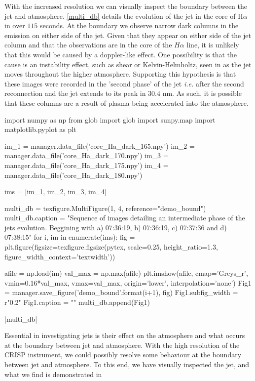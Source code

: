 \documentclass{emulateapj}
\begin{document}
With the increased resolution we can visually inspect the boundary between the jet and atmosphere.
\cref{multi_db} details the evolution of the jet in the core of H$\alpha$ in over $115$ seconds.
At the boundary we observe narrow dark columns in the emission on either side of the jet.
Given that they appear on either side of the jet column and that the observations are in the core of the $H\alpha$ line, it is unlikely that this would be caused by a doppler-like effect.
One possibility is that the cause is an instability effect, such as shear or Kelvin-Helmholtz, seen in \cite{Zaqarashvili2014} as the jet moves throughout the higher atmosphere.
Supporting this hypothesis is that these images were recorded in the 'second phase' of the jet \emph{i.e.} after the second reconnection and the jet extends to its peak in $30.4$ nm. 
As such, it is possible that these columns are a result of plasma being accelerated into the atmosphere.

\begin{pycode}
import numpy as np
from glob import glob
import sunpy.map
import matplotlib.pyplot as plt

im_1 = manager.data_file('core_Ha_dark_165.npy')
im_2 = manager.data_file('core_Ha_dark_170.npy')
im_3 = manager.data_file('core_Ha_dark_175.npy')
im_4 = manager.data_file('core_Ha_dark_180.npy')

ims = [im_1, im_2, im_3, im_4]

multi_db = texfigure.MultiFigure(1, 4, reference="demo_bound")
multi_db.caption = "Sequence of images detailing an intermediate phase of the jets evolution. Beggining with a) 07:36:19, b) 07:36:19, c) 07:37:36 and d) 07:38:15"
for i, im in enumerate(ims):
	fig = plt.figure(figsize=texfigure.figsize(pytex, scale=0.25, height_ratio=1.3, figure_width_context='textwidth'))

	afile = np.load(im)
	val_max = np.max(afile)
	plt.imshow(afile, cmap='Greys_r', vmin=0.16*val_max, vmax=val_max, origin='lower', interpolation='none')
	Fig1 = manager.save_figure('demo_bound{}'.format(i+1), fig)
	Fig1.subfig_width = r"0.2\textwidth"
	Fig1.caption = ""
	multi_db.append(Fig1)

\end{pycode}

|multi_db|


Essential in investigating jets is their effect on the atmosphere and what occurs at the boundary between jet and atmosphere.
With the high resolution of the CRISP instrument, we could possibly resolve some behaviour at the boundary between jet and atmosphere. 
To this end, we have visually inspected the jet, and what we find is demonstrated in %
\end{document}
